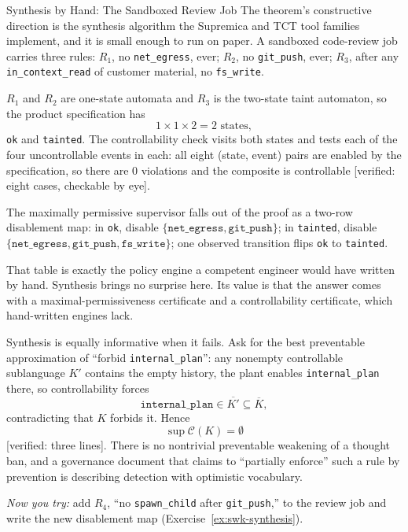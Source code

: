 \documentclass[11pt,a4paper]{article}
\theoremstyle{definition}
\theoremstyle{remark}
\begin{document}
\begin{pdexample}{Synthesis by Hand: The Sandboxed Review Job}
\setlength{\parskip}{4pt plus 1pt}
The theorem's constructive direction is the synthesis algorithm the Supremica and TCT tool
families implement, and it is small enough to run on paper. A sandboxed code-review job
carries three rules: $R_1$, no \texttt{net\_egress}, ever; $R_2$, no \texttt{git\_push},
ever; $R_3$, after any \texttt{in\_context\_read} of customer material, no \texttt{fs\_write}.

$R_1$ and $R_2$ are one-state automata and $R_3$ is the two-state taint automaton, so the
product specification has
\[
1 \times 1 \times 2 = 2 \text{ states},
\]
\texttt{ok} and \texttt{tainted}.
The controllability check visits both states and tests each of the four uncontrollable events
in each: all eight (state, event) pairs are enabled by the specification, so there are $0$
violations and the composite is controllable [verified: eight cases, checkable by eye].

The
maximally permissive supervisor falls out of the proof as a two-row disablement map:
in \texttt{ok}, disable $\{\texttt{net\_egress}, \texttt{git\_push}\}$; in \texttt{tainted},
disable $\{\texttt{net\_egress}, \texttt{git\_push}, \texttt{fs\_write}\}$; one observed
transition flips \texttt{ok} to \texttt{tainted}.

That table is exactly the policy engine a
competent engineer would have written by hand. Synthesis brings no surprise here. Its
value is that the answer comes with a maximal-permissiveness certificate and a
controllability certificate, which hand-written engines lack.

Synthesis is equally informative when it fails. Ask for the best preventable approximation
of ``forbid \texttt{internal\_plan}'': any nonempty controllable sublanguage $K'$ contains the
empty history, the plant enables \texttt{internal\_plan} there, so controllability forces
\[
\texttt{internal\_plan} \in \overline{K'} \subseteq \overline{K},
\]
contradicting that $K$
forbids it. Hence
\[
\sup\mathcal{C}(K) = \emptyset
\]
[verified: three lines]. There is no
nontrivial preventable weakening of a thought ban, and a governance document that claims to
``partially enforce'' such a rule by prevention is describing detection with optimistic
vocabulary.

\emph{Now you try:} add $R_4$, ``no \texttt{spawn\_child} after
\texttt{git\_push},'' to the review job and write the new disablement map
(Exercise~\ref{ex:swk-synthesis}).
\end{pdexample}
\end{document}

